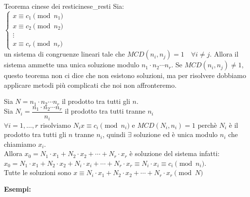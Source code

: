 \documentclass[12pt, letterpaper]{report}
\newcounter{theorem}
\newcommand{\nmu}{}
\begin{document}
		\begin{theorem}{\nmu Teorema cinese dei resti}{cinese_resti}
			Sia: \\
			$\begin{cases}
				x \equiv c_1 \pmod{n_1} \\
				x \equiv c_2 \pmod{n_2} \\
				\vdots \\
				x \equiv c_r \pmod{n_r}
			\end{cases}$ \\
			un sistema di congruenze lineari tale che $MCD(n_i, n_j) = 1 \quad \forall i \neq j$. Allora il sistema ammette una unica soluzione modulo $n_1 \cdot n_2 \cdots n_r$. Se $MCD(n_i, n_j) \neq 1$, questo teorema non ci dice che non esistono soluzioni, ma per risolvere dobbiamo applicare metodi più complicati che noi non affronteremo.
				\begin{tcolorbox}[colframe=green!75!black, colback=white!5!white, title=DIM del teorema cinese di resti, fonttitle=\bfseries]
				Sia $N = n_1 \cdot n_2 \cdots n_r$ il prodotto tra tutti gli $n$. \\
				Sia $N_i = \dfrac{n_1 \cdot n_2 \cdots n_r}{n_i}$ il prodotto tra tutti tranne $n_i$ \\
				$\forall i = 1, \dots, r$ risolviamo $N_ix \equiv c_i \pmod{n_i}$ e $MCD(N_i, n_i) = 1$ perchè $N_i$ è il prodotto tra tutti gli $n$ tranne $n_i$, quindi $\exists$ soluzione ed è unica modulo $n_i$ che chiamiamo $x_i$. \\
				Allora $x_0 = N_1 \cdot x_1 + N_2 \cdot x_2 + \cdots + N_r \cdot x_r$ è soluzione del sistema infatti: \\
				$x_0 = N_1 \cdot x_1 + N_2 \cdot x_2 + N_i \cdot x_i + \cdots + N_r \cdot x_r \equiv N_i \cdot x_i \equiv c_i \pmod{n_i}$. \\
				Tutte le soluzioni sono $x \equiv N_i \cdot x_1 + N_2 \cdot x_2 + \cdots + N_r \cdot x_r \pmod{N}$
			\end{tcolorbox}
		\end{theorem}
		\textbf{Esempi:}
\end{document}
